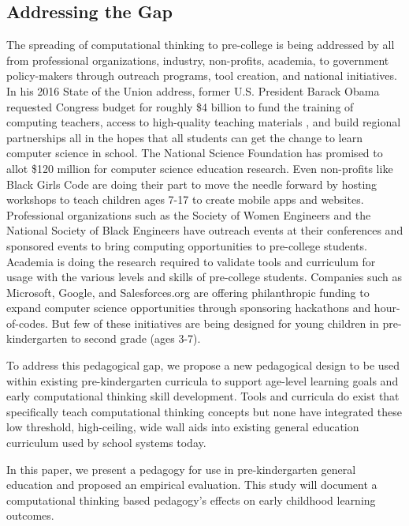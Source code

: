 \documentclass[11pt, letterpaper, onecolumn]{article}
\begin{document}
\subsection{Addressing the Gap}
%
The spreading of computational thinking to pre-college is being addressed by all from professional organizations, industry, non-profits, academia, to government policy-makers through outreach programs, tool creation, and national initiatives.
%
In his 2016 State of the Union address, former U.S. President Barack Obama requested Congress budget for roughly \$4 billion to fund the training of computing teachers, access to high-quality teaching materials , and build regional partnerships all in the hopes that all students can get the change to learn computer science in school. 
%
The National Science Foundation has promised to allot \$120 million for computer science education research. 
%
Even non-profits like Black Girls Code are doing their part to move the needle forward by hosting workshops to teach children ages 7-17 to create mobile apps and websites.
%
Professional organizations such as the Society of Women Engineers and the National Society of Black Engineers have outreach events at their conferences and sponsored events to bring computing opportunities to pre-college students.
%
Academia is doing the research required to validate tools and curriculum  for usage with the various levels and skills of pre-college students.
%
Companies such as Microsoft, Google, and Salesforces.org are offering philanthropic funding to expand computer science opportunities through sponsoring hackathons and hour-of-codes.
%
But few of these initiatives are being designed for young children in pre-kindergarten to second grade (ages 3-7). 
%

%
To address this pedagogical gap, we propose a new pedagogical design to be used within existing pre-kindergarten curricula to support age-level learning goals and early computational thinking skill development.
%
Tools and curricula do exist that specifically teach computational thinking concepts but none have integrated these low threshold, high-ceiling, wide wall aids into existing general education curriculum used by school systems today.

%
In this paper, we present a pedagogy for use in pre-kindergarten general education and proposed an empirical evaluation.
%
This study will document a computational thinking based pedagogy's effects on early childhood learning outcomes.
%
\end{document}
